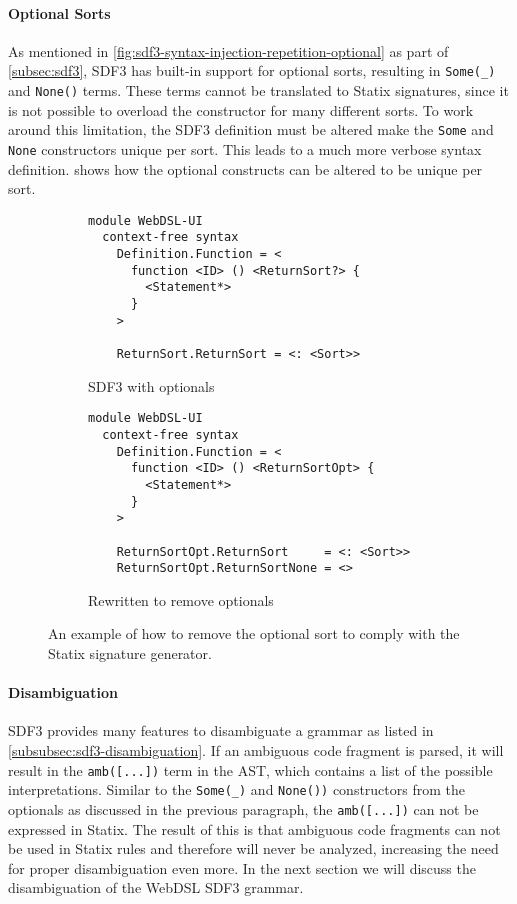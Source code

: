       \paragraph{Optional Sorts} As mentioned in \cref{fig:sdf3-syntax-injection-repetition-optional} as part of \cref{subsec:sdf3}, SDF3 has built-in support for optional sorts, resulting in \texttt{Some(\_)} and \texttt{None()} terms. These terms cannot be  translated to Statix signatures, since it is not possible to overload the constructor for many different sorts. To work around this limitation, the SDF3 definition must be altered make the \texttt{Some} and \texttt{None} constructors unique per sort. This leads to a much more verbose syntax definition.  shows how the optional constructs can be altered to be unique per sort.

      \begin{figure}
        \begin{subfigure}[b]{1\textwidth}
          \begin{verbatim}
module WebDSL-UI
  context-free syntax
    Definition.Function = <
      function <ID> () <ReturnSort?> {
        <Statement*>
      }
    >

    ReturnSort.ReturnSort = <: <Sort>>
          \end{verbatim}
          \caption{\label{fig:sdf3-remove-optionals-before}SDF3 with optionals}
        \end{subfigure}
        \begin{subfigure}[b]{1\textwidth}
          \begin{verbatim}
module WebDSL-UI
  context-free syntax
    Definition.Function = <
      function <ID> () <ReturnSortOpt> {
        <Statement*>
      }
    >

    ReturnSortOpt.ReturnSort     = <: <Sort>>
    ReturnSortOpt.ReturnSortNone = <>
          \end{verbatim}
          \caption{\label{fig:sdf3-remove-optionals-after}Rewritten to remove optionals}
        \end{subfigure}
      \caption{\label{fig:sdf3-remove-optionals}An example of how to remove the optional sort to comply with the Statix signature generator.}
      \end{figure}

      \paragraph{Disambiguation} SDF3 provides many features to disambiguate a grammar as listed in \cref{subsubsec:sdf3-disambiguation}. If an ambiguous code fragment is parsed, it will result in the \texttt{amb([...])} term in the AST, which contains a list of the possible interpretations. Similar to the \texttt{Some(\_)} and \texttt{None())} constructors from the optionals as discussed in the previous paragraph, the \texttt{amb([...])} can not be expressed in Statix. The result of this is that ambiguous code fragments can not be used in Statix rules and therefore will never be analyzed, increasing the need for proper disambiguation even more. In the next section we will discuss the disambiguation of the WebDSL SDF3 grammar.

